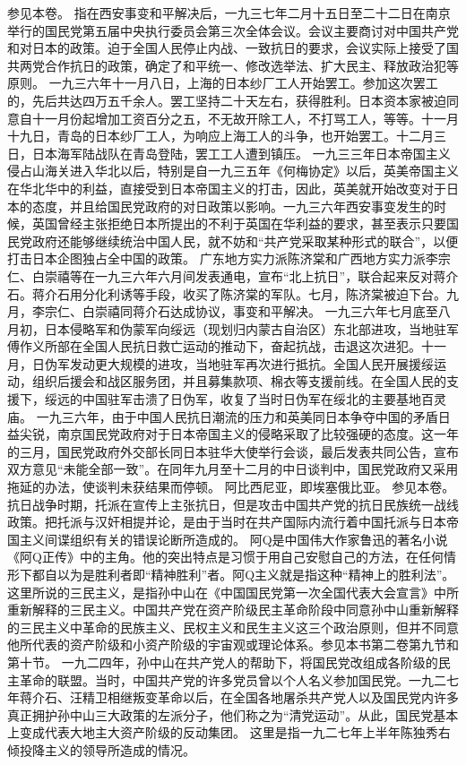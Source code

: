 \begin{maonote}
参见本卷。
指在西安事变和平解决后，一九三七年二月十五日至二十二日在南京举行的国民党第五届中央执行委员会第三次全体会议。会议主要商讨对中国共产党和对日本的政策。迫于全国人民停止内战、一致抗日的要求，会议实际上接受了国共两党合作抗日的政策，确定了和平统一、修改选举法、扩大民主、释放政治犯等原则。
一九三六年十一月八日，上海的日本纱厂工人开始罢工。参加这次罢工的，先后共达四万五千余人。罢工坚持二十天左右，获得胜利。日本资本家被迫同意自十一月份起增加工资百分之五，不无故开除工人，不打骂工人，等等。十一月十九日，青岛的日本纱厂工人，为响应上海工人的斗争，也开始罢工。十二月三日，日本海军陆战队在青岛登陆，罢工工人遭到镇压。
一九三三年日本帝国主义侵占山海关进入华北以后，特别是自一九三五年《何梅协定》以后，英美帝国主义在华北华中的利益，直接受到日本帝国主义的打击，因此，英美就开始改变对于日本的态度，并且给国民党政府的对日政策以影响。一九三六年西安事变发生的时候，英国曾经主张拒绝日本所提出的不利于英国在华利益的要求，甚至表示只要国民党政府还能够继续统治中国人民，就不妨和“共产党采取某种形式的联合”，以便打击日本企图独占全中国的政策。
广东地方实力派陈济棠和广西地方实力派李宗仁、白崇禧等在一九三六年六月间发表通电，宣布“北上抗日”，联合起来反对蒋介石。蒋介石用分化利诱等手段，收买了陈济棠的军队。七月，陈济棠被迫下台。九月，李宗仁、白崇禧同蒋介石达成协议，事变和平解决。
一九三六年七月底至八月初，日本侵略军和伪蒙军向绥远（现划归内蒙古自治区）东北部进攻，当地驻军傅作义所部在全国人民抗日救亡运动的推动下，奋起抗战，击退这次进犯。十一月，日伪军发动更大规模的进攻，当地驻军再次进行抵抗。全国人民开展援绥运动，组织后援会和战区服务团，并且募集款项、棉衣等支援前线。在全国人民的支援下，绥远的中国驻军击溃了日伪军，收复了当时日伪军在绥北的主要基地百灵庙。
一九三六年，由于中国人民抗日潮流的压力和英美同日本争夺中国的矛盾日益尖锐，南京国民党政府对于日本帝国主义的侵略采取了比较强硬的态度。这一年的三月，国民党政府外交部长同日本驻华大使举行会谈，最后发表共同公告，宣布双方意见“未能全部一致”。在同年九月至十二月的中日谈判中，国民党政府又采用拖延的办法，使谈判未获结果而停顿。
阿比西尼亚，即埃塞俄比亚。
参见本卷。抗日战争时期，托派在宣传上主张抗日，但是攻击中国共产党的抗日民族统一战线政策。把托派与汉奸相提并论，是由于当时在共产国际内流行着中国托派与日本帝国主义间谍组织有关的错误论断所造成的。
阿Q是中国伟大作家鲁迅的著名小说《阿Q正传》中的主角。他的突出特点是习惯于用自己安慰自己的方法，在任何情形下都自以为是胜利者即“精神胜利”者。阿Q主义就是指这种“精神上的胜利法”。
这里所说的三民主义，是指孙中山在《中国国民党第一次全国代表大会宣言》中所重新解释的三民主义。中国共产党在资产阶级民主革命阶段中同意孙中山重新解释的三民主义中革命的民族主义、民权主义和民生主义这三个政治原则，但并不同意他所代表的资产阶级和小资产阶级的宇宙观或理论体系。参见本书第二卷第九节和第十节。
一九二四年，孙中山在共产党人的帮助下，将国民党改组成各阶级的民主革命的联盟。当时，中国共产党的许多党员曾以个人名义参加国民党。一九二七年蒋介石、汪精卫相继叛变革命以后，在全国各地屠杀共产党人以及国民党内许多真正拥护孙中山三大政策的左派分子，他们称之为“清党运动”。从此，国民党基本上变成代表大地主大资产阶级的反动集团。
这里是指一九二七年上半年陈独秀右倾投降主义的领导所造成的情况。
\end{maonote}
